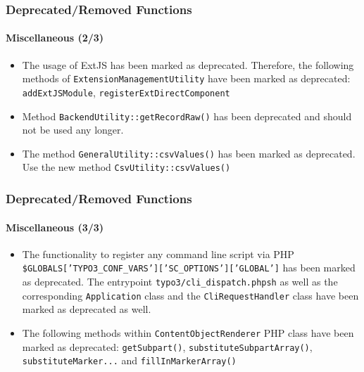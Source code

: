 \begin{frame}[fragile]
	\frametitle{Deprecated/Removed Functions}
	\framesubtitle{Miscellaneous (2/3)}

	\begin{itemize}

		\item The usage of ExtJS has been marked as deprecated. Therefore, the following methods of
			\texttt{ExtensionManagementUtility} have been marked as deprecated:
			\texttt{addExtJSModule}, \texttt{registerExtDirectComponent}

		\item Method \texttt{BackendUtility::getRecordRaw()} has been deprecated and should not
			be used any longer.

		\item The method \texttt{GeneralUtility::csvValues()} has been marked as deprecated.
			Use the new method \texttt{CsvUtility::csvValues()}

	\end{itemize}

\end{frame}



\begin{frame}[fragile]
	\frametitle{Deprecated/Removed Functions}
	\framesubtitle{Miscellaneous (3/3)}

	\begin{itemize}
		\item The functionality to register any command line script via PHP
			\texttt{\$GLOBALS['TYPO3\_CONF\_VARS']['SC\_OPTIONS']['GLOBAL']\newline['cliKeys']['my\_extension']}
			has been marked as deprecated.
			The entrypoint \texttt{typo3/cli\_dispatch.phpsh} as well as the corresponding \texttt{Application}
			class and the \texttt{CliRequestHandler} class have been marked as deprecated as well.

		\item The following methods within \texttt{ContentObjectRenderer} PHP class have been marked
			as deprecated: \texttt{getSubpart()}, \texttt{substituteSubpartArray()},
			\texttt{substituteMarker...} and \texttt{fillInMarkerArray()}

	\end{itemize}

\end{frame}

